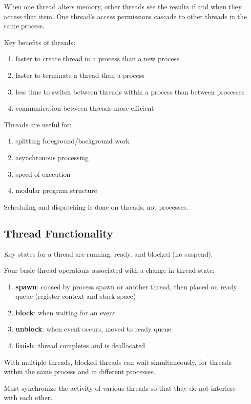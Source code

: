 \documentclass[11pt]{article}
\begin{document}
When one thread alters memory, other threads see the
results if and when they access that item.
One thread's access permissions cascade to other threads
in the same process.

Key benefits of threads:
\begin{enumerate}
\item faster to create thread in a process than a new process
\item faster to terminate a thread than a process
\item less time to switch between threads within a process
than between processes
\item communication between threads more efficient
\end{enumerate}

Threads are useful for:
\begin{enumerate}
\item splitting foreground/background work
\item asynchronous processing
\item speed of execution
\item modular program structure
\end{enumerate}

Scheduling and dispatching is done on threads, not processes.
\subsection{Thread Functionality}
\label{sec:orgd21a7cf}

Key states for a thread are running, ready, and blocked (no suspend).

Four basic thread operations associated with a change
in thread state:
\begin{enumerate}
\item \textbf{spawn}: caused by process spawn or another thread,
then placed on ready queue (register context and stack space)
\item \textbf{block}: when waiting for an event
\item \textbf{unblock}: when event occurs, moved to ready queue
\item \textbf{finish}: thread completes and is deallocated
\end{enumerate}

With multiple threads, blocked threads can wait simultaneously,
for threads within the same process and in different processes.

Must synchronize the activity of various threads so that
they do not interfere with each other.
\end{document}
